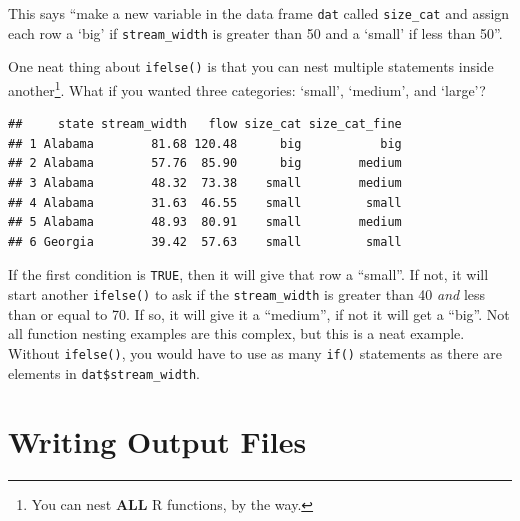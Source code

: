 \documentclass[]{book}
\newenvironment{Shaded}{\begin{snugshade}}{\end{snugshade}}
\newcommand{\DecValTok}[1]{\textcolor[rgb]{0.00,0.00,0.81}{#1}}
\newcommand{\KeywordTok}[1]{\textcolor[rgb]{0.13,0.29,0.53}{\textbf{#1}}}
\newcommand{\NormalTok}[1]{#1}
\newcommand{\OperatorTok}[1]{\textcolor[rgb]{0.81,0.36,0.00}{\textbf{#1}}}
\newcommand{\StringTok}[1]{\textcolor[rgb]{0.31,0.60,0.02}{#1}}
\let\rmarkdownfootnote\footnote%
\def\footnote{\protect\rmarkdownfootnote}
\begin{document}
This says ``make a new variable in the data frame \texttt{dat} called \texttt{size\_cat} and assign each row a `big' if \texttt{stream\_width} is greater than 50 and a `small' if less than 50''.

One neat thing about \texttt{ifelse()} is that you can nest multiple statements inside another\footnote{You can nest \textbf{ALL} R functions, by the way.}. What if you wanted three categories: `small', `medium', and `large'?

\begin{Shaded}
\end{Shaded}

\begin{verbatim}
##     state stream_width   flow size_cat size_cat_fine
## 1 Alabama        81.68 120.48      big           big
## 2 Alabama        57.76  85.90      big        medium
## 3 Alabama        48.32  73.38    small        medium
## 4 Alabama        31.63  46.55    small         small
## 5 Alabama        48.93  80.91    small        medium
## 6 Georgia        39.42  57.63    small         small
\end{verbatim}

If the first condition is \texttt{TRUE}, then it will give that row a ``small''. If not, it will start another \texttt{ifelse()} to ask if the \texttt{stream\_width} is greater than 40 \emph{and} less than or equal to 70. If so, it will give it a ``medium'', if not it will get a ``big''. Not all function nesting examples are this complex, but this is a neat example. Without \texttt{ifelse()}, you would have to use as many \texttt{if()} statements as there are elements in \texttt{dat\$stream\_width}.

\hypertarget{writing-output-files}{%
\section{Writing Output Files}\label{writing-output-files}}
\end{document}
